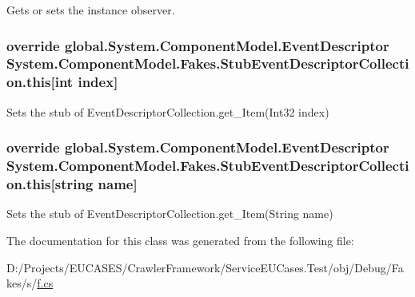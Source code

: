 Gets or sets the instance observer.

\hypertarget{class_system_1_1_component_model_1_1_fakes_1_1_stub_event_descriptor_collection_a5a326227238c771bbeef087eea21accd}{
\subsubsection[{this[int index]}]{\setlength{\rightskip}{0pt plus 5cm}override global.\-System.\-Component\-Model.\-Event\-Descriptor System.\-Component\-Model.\-Fakes.\-Stub\-Event\-Descriptor\-Collection.\-this\mbox{[}int {\bf index}\mbox{]}\hspace{0.3cm}{\ttfamily [get]}}}\label{class_system_1_1_component_model_1_1_fakes_1_1_stub_event_descriptor_collection_a5a326227238c771bbeef087eea21accd}


Sets the stub of Event\-Descriptor\-Collection.\-get\-\_\-\-Item(\-Int32 index)

\hypertarget{class_system_1_1_component_model_1_1_fakes_1_1_stub_event_descriptor_collection_a2e65f61ffe51e6b415411f8ce876678a}{
\subsubsection[{this[string name]}]{\setlength{\rightskip}{0pt plus 5cm}override global.\-System.\-Component\-Model.\-Event\-Descriptor System.\-Component\-Model.\-Fakes.\-Stub\-Event\-Descriptor\-Collection.\-this\mbox{[}string name\mbox{]}\hspace{0.3cm}{\ttfamily [get]}}}\label{class_system_1_1_component_model_1_1_fakes_1_1_stub_event_descriptor_collection_a2e65f61ffe51e6b415411f8ce876678a}


Sets the stub of Event\-Descriptor\-Collection.\-get\-\_\-\-Item(\-String name)



The documentation for this class was generated from the following file\-:\begin{DoxyCompactItemize}
\item 
D\-:/\-Projects/\-E\-U\-C\-A\-S\-E\-S/\-Crawler\-Framework/\-Service\-E\-U\-Cases.\-Test/obj/\-Debug/\-Fakes/s/\hyperlink{s_2f_8cs}{f.\-cs}\end{DoxyCompactItemize}
